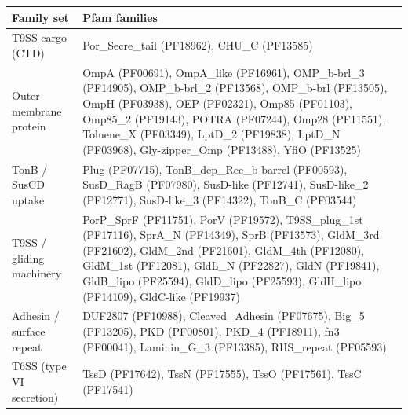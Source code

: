 \begin{tabular}{lp{}}
\toprule
Family set & Pfam families \\
\midrule
T9SS cargo (CTD) & Por\_Secre\_tail (PF18962), CHU\_C (PF13585) \\
Outer membrane protein & OmpA (PF00691), OmpA\_like (PF16961), OMP\_b-brl\_3 (PF14905), OMP\_b-brl\_2 (PF13568), OMP\_b-brl (PF13505), OmpH (PF03938), OEP (PF02321), Omp85 (PF01103), Omp85\_2 (PF19143), POTRA (PF07244), Omp28 (PF11551), Toluene\_X (PF03349), LptD\_2 (PF19838), LptD\_N (PF03968), Gly-zipper\_Omp (PF13488), YfiO (PF13525) \\
TonB / SusCD uptake & Plug (PF07715), TonB\_dep\_Rec\_b-barrel (PF00593), SusD\_RagB (PF07980), SusD-like (PF12741), SusD-like\_2 (PF12771), SusD-like\_3 (PF14322), TonB\_C (PF03544) \\
T9SS / gliding machinery & PorP\_SprF (PF11751), PorV (PF19572), T9SS\_plug\_1st (PF17116), SprA\_N (PF14349), SprB (PF13573), GldM\_3rd (PF21602), GldM\_2nd (PF21601), GldM\_4th (PF12080), GldM\_1st (PF12081), GldL\_N (PF22827), GldN (PF19841), GldB\_lipo (PF25594), GldD\_lipo (PF25593), GldH\_lipo (PF14109), GldC-like (PF19937) \\
Adhesin / surface repeat & DUF2807 (PF10988), Cleaved\_Adhesin (PF07675), Big\_5 (PF13205), PKD (PF00801), PKD\_4 (PF18911), fn3 (PF00041), Laminin\_G\_3 (PF13385), RHS\_repeat (PF05593) \\
T6SS (type VI secretion) & TssD (PF17642), TssN (PF17555), TssO (PF17561), TssC (PF17541) \\
\bottomrule
\end{tabular}
